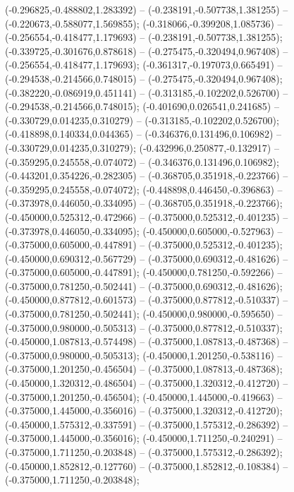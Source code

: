  (-0.296825,-0.488802,1.283392) -- (-0.238191,-0.507738,1.381255) -- (-0.220673,-0.588077,1.569855);
 (-0.318066,-0.399208,1.085736) -- (-0.256554,-0.418477,1.179693) -- (-0.238191,-0.507738,1.381255);
 (-0.339725,-0.301676,0.878618) -- (-0.275475,-0.320494,0.967408) -- (-0.256554,-0.418477,1.179693);
 (-0.361317,-0.197073,0.665491) -- (-0.294538,-0.214566,0.748015) -- (-0.275475,-0.320494,0.967408);
 (-0.382220,-0.086919,0.451141) -- (-0.313185,-0.102202,0.526700) -- (-0.294538,-0.214566,0.748015);
 (-0.401690,0.026541,0.241685) -- (-0.330729,0.014235,0.310279) -- (-0.313185,-0.102202,0.526700);
 (-0.418898,0.140334,0.044365) -- (-0.346376,0.131496,0.106982) -- (-0.330729,0.014235,0.310279);
 (-0.432996,0.250877,-0.132917) -- (-0.359295,0.245558,-0.074072) -- (-0.346376,0.131496,0.106982);
 (-0.443201,0.354226,-0.282305) -- (-0.368705,0.351918,-0.223766) -- (-0.359295,0.245558,-0.074072);
 (-0.448898,0.446450,-0.396863) -- (-0.373978,0.446050,-0.334095) -- (-0.368705,0.351918,-0.223766);
 (-0.450000,0.525312,-0.472966) -- (-0.375000,0.525312,-0.401235) -- (-0.373978,0.446050,-0.334095);
 (-0.450000,0.605000,-0.527963) -- (-0.375000,0.605000,-0.447891) -- (-0.375000,0.525312,-0.401235);
 (-0.450000,0.690312,-0.567729) -- (-0.375000,0.690312,-0.481626) -- (-0.375000,0.605000,-0.447891);
 (-0.450000,0.781250,-0.592266) -- (-0.375000,0.781250,-0.502441) -- (-0.375000,0.690312,-0.481626);
 (-0.450000,0.877812,-0.601573) -- (-0.375000,0.877812,-0.510337) -- (-0.375000,0.781250,-0.502441);
 (-0.450000,0.980000,-0.595650) -- (-0.375000,0.980000,-0.505313) -- (-0.375000,0.877812,-0.510337);
 (-0.450000,1.087813,-0.574498) -- (-0.375000,1.087813,-0.487368) -- (-0.375000,0.980000,-0.505313);
 (-0.450000,1.201250,-0.538116) -- (-0.375000,1.201250,-0.456504) -- (-0.375000,1.087813,-0.487368);
 (-0.450000,1.320312,-0.486504) -- (-0.375000,1.320312,-0.412720) -- (-0.375000,1.201250,-0.456504);
 (-0.450000,1.445000,-0.419663) -- (-0.375000,1.445000,-0.356016) -- (-0.375000,1.320312,-0.412720);
 (-0.450000,1.575312,-0.337591) -- (-0.375000,1.575312,-0.286392) -- (-0.375000,1.445000,-0.356016);
 (-0.450000,1.711250,-0.240291) -- (-0.375000,1.711250,-0.203848) -- (-0.375000,1.575312,-0.286392);
 (-0.450000,1.852812,-0.127760) -- (-0.375000,1.852812,-0.108384) -- (-0.375000,1.711250,-0.203848);
